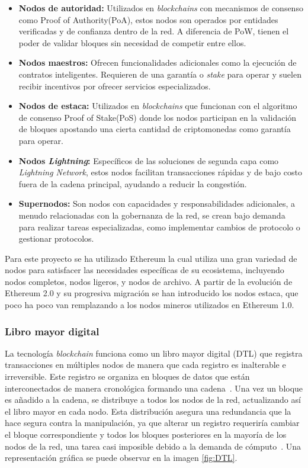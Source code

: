 \begin{itemize}
\item \textbf{Nodos de autoridad:} Utilizados en \textit{blockchains} con mecanismos de consenso como Proof of Authority(PoA), estos nodos son operados por entidades verificadas y de confianza dentro de la red. A diferencia de PoW, tienen el poder de validar bloques sin necesidad de competir entre ellos.

\item \textbf{Nodos maestros:} Ofrecen funcionalidades adicionales como la ejecución de contratos inteligentes. Requieren de una garantía o \textit{stake} para operar y suelen recibir incentivos por ofrecer servicios especializados.

\item \textbf{Nodos de estaca:} Utilizados en \textit{blockchains} que funcionan con el algoritmo de consenso Proof of Stake(PoS) donde los nodos participan en la validación de bloques apostando una cierta cantidad de criptomonedas como garantía para operar.

\item \textbf{Nodos \textit{Lightning}:} Específicos de las soluciones de segunda capa como \textit{Lightning Network}, estos nodos facilitan transacciones rápidas y de bajo costo fuera de la cadena principal, ayudando a reducir la congestión.

\item \textbf{Supernodos:} Son nodos con capacidades y responsabilidades adicionales, a menudo relacionadas con la gobernanza de la red, se crean bajo demanda para realizar tareas especializadas, como implementar cambios de protocolo o gestionar protocolos.
\end{itemize}

Para este proyecto se ha utilizado Ethereum la cual utiliza una gran variedad de nodos para satisfacer las necesidades específicas de su ecosistema, incluyendo nodos completos, nodos ligeros, y nodos de archivo. A partir de la evolución de Ethereum 2.0 y su progresiva migración se han introducido los nodos estaca, que poco ha poco van remplazando a los nodos mineros utilizados en Ethereum 1.0.


\subsubsection{Libro mayor digital}

La tecnología \textit{blockchain} funciona como un libro mayor digital (DTL) que registra transacciones en múltiples nodos de manera que cada registro es inalterable e irreversible. 
Este registro se organiza en bloques de datos que están interconectados de manera cronológica formando una cadena~\cite{wiki:DTL}.
Una vez un bloque es añadido a la cadena, se distribuye a todos los nodos de la red, actualizando así el libro mayor en cada nodo. Esta distribución asegura una redundancia que la hace segura contra la manipulación, ya que alterar un registro requeriría cambiar el bloque correspondiente y todos los bloques posteriores en la mayoría de los nodos de la red, una tarea casi imposible debido a la demanda de cómputo~\cite{BlockchainFuncionamiento}.
 Una representación gráfica se puede observar en la imagen \ref{fig:DTL}.

